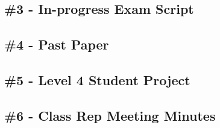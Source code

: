 \subsection{\#3 - In-progress Exam Script}
\label{subsec:analysis_case_studies_3}

\subsection{\#4 - Past Paper}
\label{subsec:analysis_case_studies_4}

\subsection{\#5 - Level 4 Student Project}
\label{subsec:analysis_case_studies_5}

\subsection{\#6 - Class Rep Meeting Minutes}
\label{subsec:analysis_case_studies_6}
